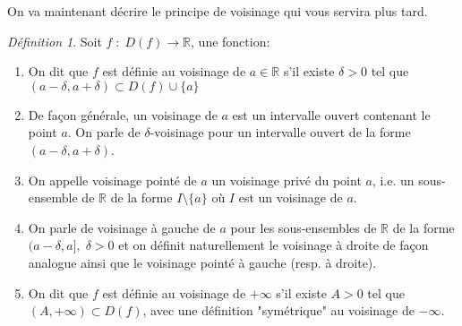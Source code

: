 \documentclass[oneside,12pt,french,table]{book}
\theoremstyle{definition}
\theoremstyle{plain}
\theoremstyle{remark}
\newtheorem{defi}[definition]{Définition}
\newcommand{\Rr}{{\mathbb{R}}}
\begin{document}
On va maintenant décrire le principe de voisinage qui vous servira plus tard.
\begin{defi}Soit $f\;:\; D(f)\longrightarrow \Rr$, une fonction: 
\begin{enumerate}
    \item On dit que $f$ est définie au voisinage de $a\in \Rr$ s'il existe $\delta >0$ tel que $(a-\delta,a+\delta)\subset D(f)\cup\{a\}$
    \item De façon générale, un voisinage de $a$ est un intervalle ouvert contenant le point $a$. On parle de $\delta $-voisinage pour un intervalle ouvert de la forme $(a-\delta,a+\delta)$. 
    \item On appelle voisinage pointé de $a$ un voisinage privé du point $a$, i.e. un sous-ensemble de $\Rr$ de la forme $I\setminus \{a\}$ où $I$ est un voisinage de $a$.
    \item On parle de voisinage à gauche de $a$ pour les sous-ensembles de $\Rr$ de la forme $(a-\delta,a],\; \delta>0$ et on définit naturellement le voisinage à droite de façon analogue ainsi que le voisinage pointé à gauche (resp. à droite).
    \item On dit que $f$ est définie au voisinage de $+\infty$ s'il existe $A>0$ tel que $(A,+\infty)\subset D(f)$, avec une définition "symétrique" au voisinage de $-\infty$.
\end{enumerate}
\end{defi}
\end{document}
